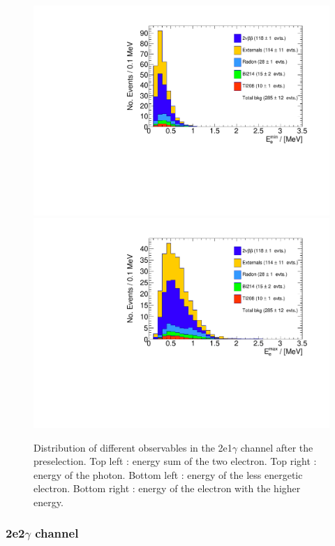 \documentclass[main.tex]{subfiles}
\begin{document}
\begin{figure}[h!]
\includegraphics[scale=0.35]{pictures/FinalResults/bb2nu2/150/preselection/preSelection2e1gBKG_min_e_energy.pdf}
\includegraphics[scale=0.35]{pictures/FinalResults/bb2nu2/150/preselection/preSelection2e1gBKG_max_e_energy.pdf}
\caption{Distribution of different observables in the 2e1$\gamma$ channel after the preselection. Top left : energy sum of the two electron. Top right : energy of the photon. Bottom left : energy of the less energetic electron. Bottom right : energy of the electron with the higher energy.}
\label{preselection2e1g_150}
\end{figure}


\FloatBarrier


\subsubsection{2e2$\gamma$ channel}
\end{document}
